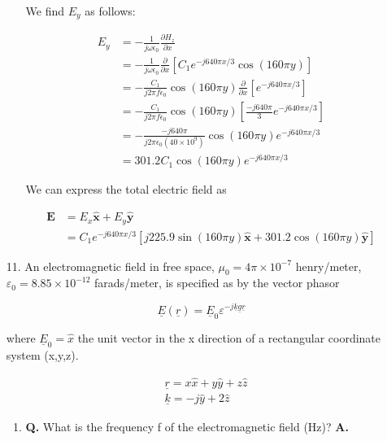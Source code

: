 \documentclass[main.tex]{subfiles}
\begin{document}
\begin{enumerate}
\begin{enumerate}
        We find $E_y$ as follows:
        
        $$
        \begin{aligned}
        E_y & =-\frac{1}{j \omega \epsilon_0} \frac{\partial H_z}{\partial x} \\
        & =-\frac{1}{j \omega \epsilon_0} \frac{\partial}{\partial x}\left[C_1 e^{-j 640 \pi x / 3} \cos (160 \pi y)\right] \\
        & =-\frac{C_1}{j 2 \pi f \epsilon_0} \cos (160 \pi y) \frac{\partial}{\partial x}\left[e^{-j 640 \pi x / 3}\right] \\
        & =-\frac{C_1}{j 2 \pi f \epsilon_0} \cos (160 \pi y)\left[\frac{-j 640 \pi}{3} e^{-j 640 \pi x / 3}\right] \\
        & =-\frac{-j 640 \pi}{j 2 \pi \epsilon_0\left(40 \times 10^9\right)} \cos (160 \pi y) e^{-j 640 \pi x / 3} \\
        & =301.2 C_1 \cos (160 \pi y) e^{-j 640 \pi x / 3}
        \end{aligned}
        $$

        We can express the total electric field as
        
        $$
        \begin{aligned}
        \mathbf{E} & =E_x \hat{\mathbf{x}}+E_y \hat{\mathbf{y}} \\
        & =C_1 e^{-j 640 \pi x / 3}[j 225.9 \sin (160 \pi y) \hat{\mathbf{x}}+301.2 \cos (160 \pi y) \hat{\mathbf{y}}]
        \end{aligned}
        $$
        
    \end{enumerate}
    
\item [11.] An electromagnetic field in free space, $\mu_{0}=4 \pi \times 10^{-7}$ henry/meter, $\varepsilon_0 = 8.85 \times 10^{-12}$ farads/meter, is specified as by the vector phasor 

$$\underline{E}(\underline{r})=\underline{E}_{0} \varepsilon^{-j \underline{k} \underline{g} \underline{r}}$$

where $\underline{E}_{0}=\hat{x}$ the unit vector in the x direction of a rectangular coordinate system (x,y,z).

$$\begin{aligned}
&\underline{r}=x \hat{x}+y \hat{y}+z \hat{z} \\
&\underline{k}=-j \hat{y}+2 \hat{z}
\end{aligned}$$

    \begin{enumerate}
        \item \textbf{Q.} What is the frequency f of the electromagnetic field (Hz)? \textbf{A.}


\end{enumerate}
\end{enumerate}
\end{document}
